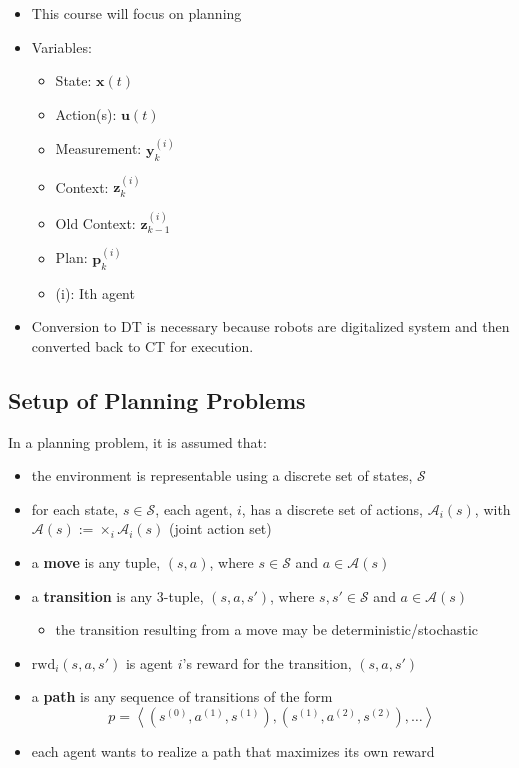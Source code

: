 \begin{summary}
    \begin{itemize}
        \item This course will focus on planning
        \item Variables:
        \begin{itemize}
            \item State: $\mathbf{x}(t)$
            \item Action(s): $\mathbf{u}(t)$
            \item Measurement: $\mathbf{y}_k^{(i)}$
            \item Context: $\mathbf{z}_k^{(i)}$
            \item Old Context: $\mathbf{z}_{k-1}^{(i)}$
            \item Plan: $\mathbf{p}_k^{(i)}$
            \item (i): Ith agent
        \end{itemize}
        \item Conversion to DT is necessary because robots are digitalized system and then converted back to CT for execution.
    \end{itemize}
\end{summary}

\subsection{Setup of Planning Problems}
\begin{summary}
In a planning problem, it is assumed that:
    \begin{itemize}
        \item the environment is representable using a discrete set of states, $\mathcal{S}$
        \item for each state, $s \in \mathcal{S}$, each agent, $i$, has a discrete set of actions, $\mathcal{A}_i(s)$, with $\mathcal{A}(s) := \times_i \mathcal{A}_i(s)$ (joint action set)
        \item a \textbf{move} is any tuple, $(s, a)$, where $s \in \mathcal{S}$ and $a \in \mathcal{A}(s)$
        \item a \textbf{transition} is any 3-tuple, $(s, a, s')$, where $s, s' \in \mathcal{S}$ and $a \in \mathcal{A}(s)$
        \begin{itemize}
            \item the transition resulting from a move may be deterministic/stochastic
        \end{itemize}
        \item $\text{rwd}_i(s, a, s')$ is agent $i$'s reward for the transition, $(s, a, s')$
        \item a \textbf{path} is any sequence of transitions of the form
        \[
        p = \left\langle (s^{(0)}, a^{(1)}, s^{(1)}), (s^{(1)}, a^{(2)}, s^{(2)}), \ldots \right\rangle
        \]
        \item each agent wants to realize a path that maximizes its own reward
    \end{itemize}
\end{summary}

